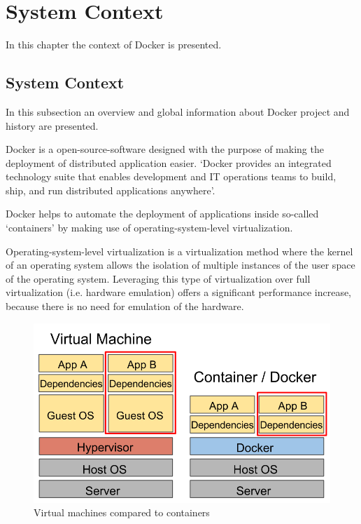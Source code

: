 \chapter{System Context}
\label{ch:context}

In this chapter the context of Docker is presented.%

\section{System Context}

In this subsection an overview and global information about Docker project and history are presented. 

Docker is a open-source-software designed with the purpose of making the deployment of distributed application easier.
`Docker provides an integrated technology suite that enables development and IT operations teams to build, ship, and run distributed applications anywhere'\cite{whatisdocker}.

Docker helps to automate the deployment of applications inside so-called `containers' by making use of operating-system-level virtualization.

Operating-system-level virtualization is a virtualization method where the kernel of an operating system allows the isolation of multiple instances of the user space of the operating system. Leveraging this type of virtualization over full virtualization (i.e. hardware emulation) offers a significant performance increase, because there is no need for emulation of the hardware.\cite{VirtualizationTechnologies}

\begin{figure}[b!]
\centering
\includegraphics[scale=0.40,keepaspectratio=true]{./2-context/vmvsdocker}
\caption{Virtual machines compared to containers\cite{benchmarker}}
\label{fig:vmvsdocker}
\end{figure}

